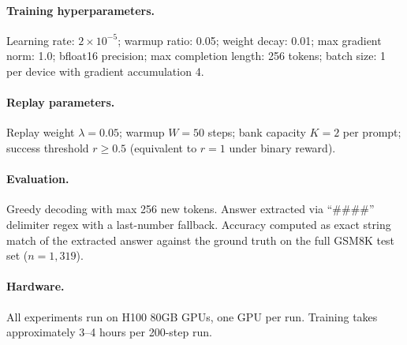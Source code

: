 \paragraph{Training hyperparameters.}
Learning rate: $2{\times}10^{-5}$; warmup ratio: 0.05; weight decay: 0.01; max gradient norm: 1.0; bfloat16 precision; max completion length: 256 tokens; batch size: 1 per device with gradient accumulation 4.

\paragraph{Replay parameters.}
Replay weight $\lambda = 0.05$; warmup $W = 50$ steps; bank capacity $K = 2$ per prompt; success threshold $r \geq 0.5$ (equivalent to $r = 1$ under binary reward).

\paragraph{Evaluation.}
Greedy decoding with max 256 new tokens. Answer extracted via ``\#\#\#\#'' delimiter regex with a last-number fallback. Accuracy computed as exact string match of the extracted answer against the ground truth on the full GSM8K test set ($n = 1{,}319$).

\paragraph{Hardware.}
All experiments run on H100 80GB GPUs, one GPU per run. Training takes approximately 3--4 hours per 200-step run.
